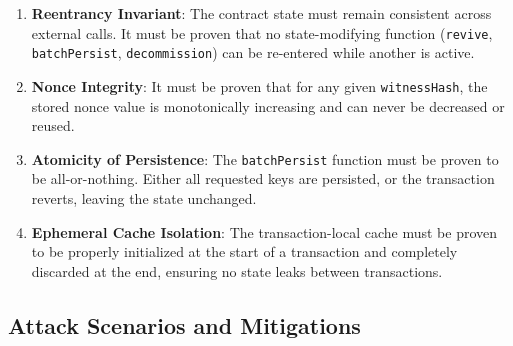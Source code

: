 \documentclass{article}
\begin{document}
\begin{enumerate}
\item \textbf{Reentrancy Invariant}: The contract state must remain consistent across external calls. It must be proven that no state-modifying function (\texttt{revive}, \texttt{batchPersist}, \texttt{decommission}) can be re-entered while another is active.
\item \textbf{Nonce Integrity}: It must be proven that for any given \texttt{witnessHash}, the stored nonce value is monotonically increasing and can never be decreased or reused.
\item \textbf{Atomicity of Persistence}: The \texttt{batchPersist} function must be proven to be all-or-nothing. Either all requested keys are persisted, or the transaction reverts, leaving the state unchanged.
\item \textbf{Ephemeral Cache Isolation}: The transaction-local cache must be proven to be properly initialized at the start of a transaction and completely discarded at the end, ensuring no state leaks between transactions.
\end{enumerate}

\subsection{Attack Scenarios and Mitigations}
\end{document}
